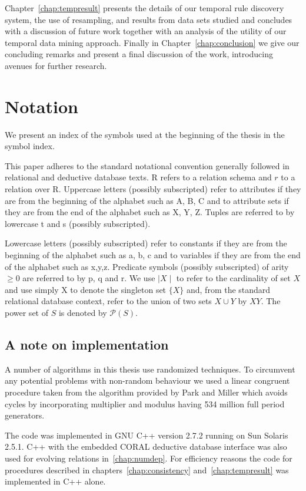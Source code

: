\medskip

Chapter~\ref{chap:tempresult} presents the details of our temporal
rule discovery system, the use of resampling, and results from data
sets studied and concludes with a discussion of future work together
with an analysis of the utility of our temporal data mining approach.
Finally in Chapter~\ref{chap:conclusion} we give our concluding
remarks and present a final discussion of the work, introducing
avenues for further research.


\section{Notation}


We present an index of the symbols used at the beginning of the thesis
in the symbol index.

\smallskip

This paper adheres to the standard notational convention generally followed in
relational and deductive database texts.  R refers to a relation
schema and $r$ to a relation over R.  Uppercase letters (possibly
subscripted) refer to attributes if they are from the beginning of the
alphabet such as A, B, C and to attribute sets if they are from the
end of the alphabet such as X, Y, Z.  Tuples are referred to by
lowercase t and s (possibly subscripted).

\medskip

Lowercase letters (possibly subscripted) refer to constants if they are from the beginning of the alphabet such as a, b, c and to variables if they are from the end of the alphabet such as x,y,z.  Predicate symbols (possibly subscripted) of arity $\ge 0$ are referred to by
p, q and r. 
We use $\mid X \mid$ to refer to the cardinality of set $X$ and use simply
X to denote the singleton set $\{ X \}$ and, from the standard
relational database context, refer to the union of
two sets $X \cup Y$ by $XY$. The power set of $S$ is
denoted by $\mathcal{P}(S)$. 

\subsection{A note on implementation}

A number of algorithms in this thesis use randomized techniques. To
circumvent any potential problems with non-random behaviour we used
a linear congruent procedure taken
from the algorithm provided by Park and Miller \cite{pm88} which
avoids cycles by incorporating multiplier and modulus
having 534 million full period generators. 

\smallskip
The code was implemented in GNU C++ version 2.7.2 running
on Sun Solaris 2.5.1.  C++ with
the embedded CORAL deductive
database interface \cite{rss92} was also used for evolving relations
in~\ref{chap:numdep}. For efficiency reasons the code for procedures
described in chapters~\ref{chap:consistency} and~\ref{chap:tempresult}
was implemented in C++ alone.


